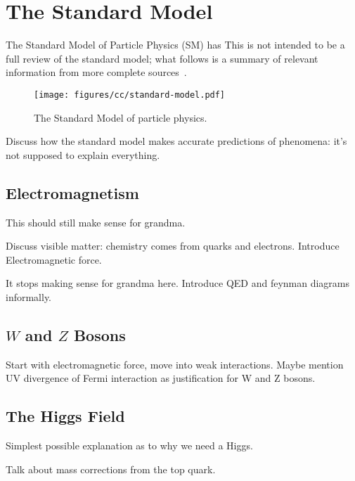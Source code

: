 \section{The Standard Model}
The Standard Model of Particle Physics (SM) has
This is not intended to be a full review of the standard model; what follows is a summary of relevant information from more complete sources~\cite{peskin}.
\begin{figure}
  \texttt{[image: figures/cc/standard-model.pdf]}
  \caption[The Standard Model of particle physics]{The Standard Model of particle physics.}
\end{figure}

Discuss how the standard model makes accurate predictions of phenomena: it's not supposed to explain everything.
\subsection{Electromagnetism}

This should still make sense for grandma.

Discuss visible matter: chemistry comes from quarks and electrons. Introduce Electromagnetic force.

It stops making sense for grandma here. Introduce QED and feynman diagrams informally.

\subsection{$W$ and $Z$ Bosons}
Start with electromagnetic force, move into weak interactions. Maybe mention UV divergence of Fermi interaction as justification for W and Z bosons.
\subsection{The Higgs Field}
Simplest possible explanation as to why we need a Higgs.

Talk about mass corrections from the top quark.
